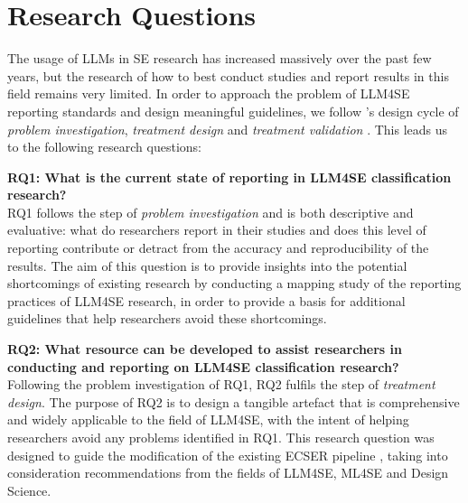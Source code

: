 \documentclass[a4paper]{article}
\newcommand{\emphasize}[1]{\textbf{#1}}
\begin{document}
\section{Research Questions} \label{Research approach} 

The usage of LLMs in SE research has increased massively over the past few years, but the research of how to best conduct studies and report results in this field remains very limited. In order to approach the problem of LLM4SE reporting standards and design meaningful guidelines, we follow \citeauthor{Wieringa2014}'s design cycle of \textit{problem investigation}, \textit{treatment design} and \textit{treatment validation} \cite{Wieringa2014}. This leads us to the following research questions:

\emphasize{RQ1: What is the current state of reporting in LLM4SE classification research?} \\
RQ1 follows the step of \textit{problem investigation} and is both descriptive and evaluative: what do researchers report in their studies and does this level of reporting contribute or detract from the accuracy and reproducibility of the results. The aim of this question is to provide insights into the potential shortcomings of existing research by conducting a mapping study of the reporting practices of LLM4SE research, in order to provide a basis for additional guidelines that help researchers avoid these shortcomings. 


\emphasize{RQ2: What resource can be developed to assist researchers in conducting and reporting on LLM4SE classification research?}\\
Following the problem investigation of RQ1, RQ2 fulfils the step of \textit{treatment design}. The purpose of RQ2 is to design a tangible artefact that is comprehensive and widely applicable to the field of LLM4SE, with the intent of helping researchers avoid any problems identified in RQ1. This research question was designed to guide the modification of the existing ECSER pipeline \cite{Dellanna2022}, taking into consideration recommendations from the fields of LLM4SE, ML4SE and Design Science.
\end{document}
